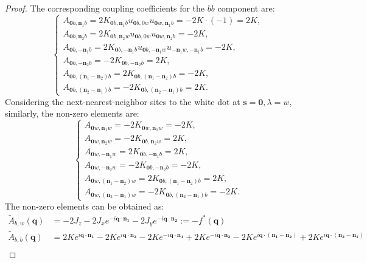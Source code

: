 \begin{proof}
The corresponding coupling coefficients for the $bb$ component are:
$$
\begin{cases}
A_{\mathbf 0b, \mathbf{n}_1 b}=2K_{\mathbf 0b, \mathbf{n}_1 b}u_{\mathbf 0b, 0 w}u_{\mathbf 0w, \mathbf{n}_1 b}=-2K\cdot (-1) = 2K, \\
A_{\mathbf 0b, \mathbf{n}_2b}=2K_{\mathbf 0b, \mathbf{n}_2w}u_{\mathbf 0b, 0 w}u_{\mathbf 0w, \mathbf{n}_2 b}=-2K, \\
A_{\mathbf 0b, -\mathbf{n}_1 b}=2K_{\mathbf 0b, -\mathbf{n}_1 b}u_{\mathbf 0b, -\mathbf{n}_1 w}u_{-\mathbf{n}_1 w, -\mathbf{n}_1 b}= -2K, \\
A_{\mathbf 0b, -\mathbf{n}_2b}=-2K_{\mathbf 0b, -\mathbf{n}_2b}=2K, \\
A_{\mathbf 0b, (\mathbf{n}_1 - \mathbf{n}_2) b}=2K_{\mathbf 0b, (\mathbf{n}_1 - \mathbf{n}_2) b}= -2K, \\
A_{\mathbf 0b, (\mathbf{n}_2 - \mathbf{n}_1)b}=-2K_{\mathbf 0b, (\mathbf{n}_2 - \mathbf{n}_1)b}=2K.
\end{cases}
$$
Considering the next-nearest-neighbor sites to the white dot at $\mathbf{s} = \mathbf{0}, \lambda = w$, similarly, the non-zero elements are:
$$
\begin{cases}
A_{\mathbf 0w, \mathbf{n}_1 w}=-2K_{\mathbf 0w, \mathbf{n}_1 w}= -2K, \\
A_{\mathbf 0w, \mathbf{n}_2w}=-2K_{\mathbf 0b, \mathbf{n}_2w}=2K, \\
A_{\mathbf 0w, -\mathbf{n}_1 w}=2K_{\mathbf 0b, -\mathbf{n}_1 b}= 2K, \\
A_{\mathbf 0w, -\mathbf{n}_2w}=-2K_{\mathbf 0b, -\mathbf{n}_2b}=-2K, \\
A_{\mathbf 0w, (\mathbf{n}_1 - \mathbf{n}_2)w}=2K_{\mathbf 0b, (\mathbf{n}_1 - \mathbf{n}_2) b}= 2K, \\
A_{\mathbf 0w, (\mathbf{n}_2 - \mathbf{n}_1)w}=-2K_{\mathbf 0b, (\mathbf{n}_2 - \mathbf{n}_1)b}=-2K.
\end{cases}
$$
The non-zero elements can be obtained as:
\begin{align*}
\tilde A_{b,w}(\mathbf{q}) &= -2J_z - 2J_{x} e^{-i \mathbf q \cdot \mathbf{n_1}} - 2J_{y} e^{-i \mathbf q \cdot \mathbf{n_2}}:=-f^*(\mathbf{q}) \\
\tilde A_{b,b}(\mathbf{q}) &= 2Ke^{i \mathbf q \cdot \mathbf{n_1}} - 2K e^{i \mathbf q \cdot \mathbf{n_2}} - 2K e^{-i \mathbf q \cdot \mathbf{n_1}} + 2K e^{-i \mathbf q \cdot \mathbf{n_2}} -2K e^{i \mathbf q \cdot (\mathbf{n_1} - \mathbf{n_2})}+2K e^{i \mathbf q \cdot (\mathbf{n_2} - \mathbf{n_1})} \\

\end{align*}
\end{proof}
